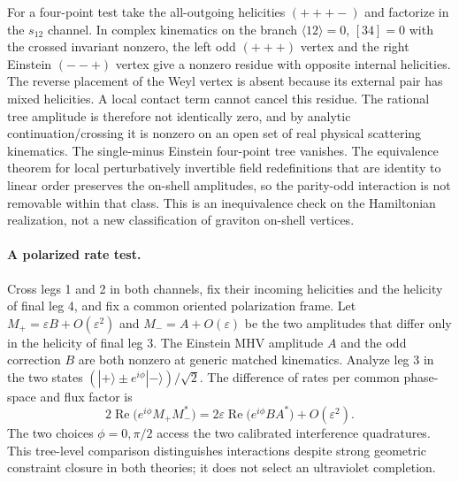 \documentclass[11pt]{article}
\newcommand{\ep}{\varepsilon}
\begin{document}
For a four-point test take the all-outgoing helicities \((+++-)\) and factorize in the \(s_{12}\) channel. In complex kinematics on the branch \(\langle12\rangle=0\), \([34]=0\) with the crossed invariant nonzero, the left odd \((+++)\) vertex and the right Einstein \((--+)\) vertex give a nonzero residue with opposite internal helicities. The reverse placement of the Weyl vertex is absent because its external pair has mixed helicities. A local contact term cannot cancel this residue. The rational tree amplitude is therefore not identically zero, and by analytic continuation/crossing it is nonzero on an open set of real physical scattering kinematics. The single-minus Einstein four-point tree vanishes. The equivalence theorem for local perturbatively invertible field redefinitions that are identity to linear order preserves the on-shell amplitudes, so the parity-odd interaction is not removable within that class. This is an inequivalence check on the Hamiltonian realization, not a new classification of graviton on-shell vertices.

\paragraph{A polarized rate test.}
Cross legs 1 and 2 in both channels, fix their incoming helicities and the helicity of final leg 4, and fix a common oriented polarization frame. Let \(M_+=\ep B+O(\ep^2)\) and \(M_-=A+O(\ep)\) be the two amplitudes that differ only in the helicity of final leg 3. The Einstein MHV amplitude \(A\) and the odd correction \(B\) are both nonzero at generic matched kinematics. Analyze leg 3 in the two states \((|+\rangle\pm e^{i\phi}|-\rangle)/\sqrt2\). The difference of rates per common phase-space and flux factor is
\[
  2\operatorname{Re}\bigl(e^{i\phi}M_+M_-^*\bigr)
  =2\ep\operatorname{Re}\bigl(e^{i\phi}B A^*\bigr)+O(\ep^2).
\]
The two choices \(\phi=0,\pi/2\) access the two calibrated interference quadratures. This tree-level comparison distinguishes interactions despite strong geometric constraint closure in both theories; it does not select an ultraviolet completion.
\end{document}
